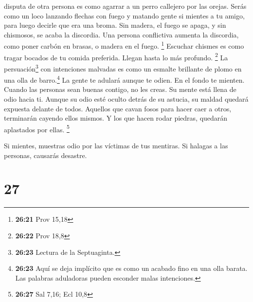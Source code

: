 disputa de otra persona es como agarrar a un perro callejero por las
orejas.  Serás como un loco lanzando flechas con fuego y
matando gente  si mientes a tu amigo, para luego decirle
que era una broma.  Sin madera, el fuego se apaga, y sin
chismosos, se acaba la discordia.  Una persona
conflictiva aumenta la discordia, como poner carbón en brasas, o madera
en el fuego. \footnote{\textbf{26:21} Prov 15,18} 
Escuchar chismes es como tragar bocados de tu comida preferida. Llegan
hasta lo más profundo. \footnote{\textbf{26:22} Prov 18,8}
 La persuación\footnote{\textbf{26:23} Lectura de la
  Septuaginta.} con intenciones malvadas es como un esmalte brillante de
plomo en una olla de barro.\footnote{\textbf{26:23} Aquí se deja
  implícito que es como un acabado fino en una olla barata. Las palabras
  aduladoras pueden esconder malas intenciones.}  La
gente te adulará aunque te odien. En el fondo te mienten.
 Cuando las personas sean buenas contigo, no les creas.
Su mente está llena de odio hacia ti.  Aunque su odio
esté oculto detrás de su astucia, su maldad quedará expuesta delante de
todos.  Aquellos que cavan fosos para hacer caer a otros,
terminarán cayendo ellos mismos. Y los que hacen rodar piedras, quedarán
aplastados por ellas. \footnote{\textbf{26:27} Sal 7,16; Ecl 10,8}

 Si mientes, muestras odio por las víctimas de tus
mentiras. Si halagas a las personas, causarás desastre.

\hypertarget{section-26}{%
\section{27}\label{section-26}}

